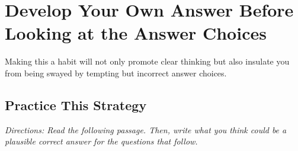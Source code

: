 \section{\sloppy Develop Your Own Answer Before Looking at the Answer Choices}

Making this a habit will not only promote clear thinking but also insulate you from being swayed by tempting but incorrect answer choices.

\subsection{Practice This Strategy}

\textit{Directions: Read the following passage. Then, write what you think could be a plausible correct answer for the questions that follow.}

